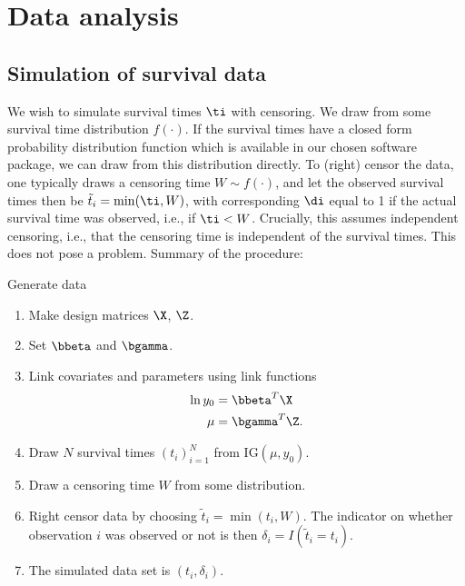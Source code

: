 \chapter{Data analysis}

\section{Simulation of survival data}

We wish to simulate survival times $\ti$ with censoring. We draw from some survival time distribution $f(\cdot)$. If the survival times have a closed form probability distribution function which is available in our chosen software package, we can draw from this distribution directly. To (right) censor the data, one typically draws a censoring time $W\sim f(\cdot)$, and let the observed survival times then be $\tilde{t}_i=\min(\ti,W)$, with corresponding $\di$ equal to 1 if the actual survival time was observed, i.e., if $\ti<W$. Crucially, this assumes independent censoring, i.e., that the censoring time is independent of the survival times. This does not pose a problem. Summary of the procedure:

\begin{algorithm}
\caption{Generate data}
\label{algo:sim}
\begin{enumerate}
    \item Make design matrices $\X$, $\Z$.
    \item Set $\bbeta$ and $\bgamma$.
    \item Link covariates and parameters using link functions
        \begin{align*}
            \ln y_0&=\bbeta^T\X \\
            \mu&=\bgamma^T\Z.
        \end{align*}
    \item Draw $N$ survival times $(t_i)_{i=1}^N$ from IG$(\mu,y_0)$.
    \item Draw a censoring time $W$ from some distribution.
    \item Right censor data by choosing $\widetilde{t}_i=\min(t_i,W)$. The indicator on whether observation $i$ was observed or not is then $\delta_i=I(\widetilde{t}_i=t_i)$.
    \item The simulated data set is $(t_i,\delta_i)$.
\end{enumerate}
\end{algorithm}

